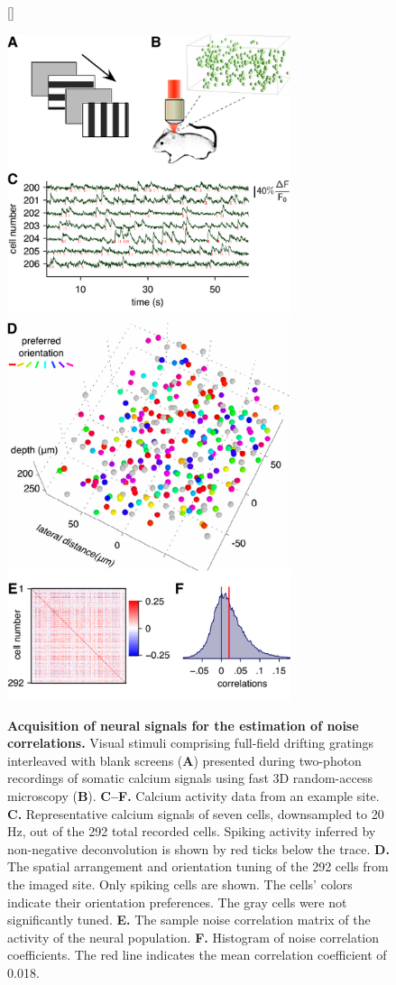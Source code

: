 \documentclass[10pt]{article}
\begin{document}
\begin{figure}    [\FBwidth]
    {\caption{{\bf Acquisition of neural signals for the estimation of noise correlations.}
    Visual stimuli comprising full-field drifting gratings interleaved with blank screens ({\bf A}) presented during two-photon recordings of somatic calcium signals using fast 3D random-access microscopy ({\bf B}). 
    {\bf C--F.} Calcium activity data from an example site.
    {\bf C.} Representative calcium signals of seven cells, downsampled to 20 Hz, out of the 292 total recorded cells. Spiking activity inferred by non-negative deconvolution is shown by red ticks below the trace.
    {\bf D.} The spatial arrangement and orientation tuning of the 292 cells from the imaged site. Only spiking cells are shown. The cells' colors indicate their orientation preferences. The gray cells were not significantly tuned.
    {\bf E.} The sample noise correlation matrix of the activity of the neural population. 
    {\bf F.} Histogram of noise correlation coefficients. The red line indicates the mean correlation coefficient of 0.018.
} \label{fig:2}}
    {\includegraphics[width=8.3cm]{figures/Figure02.pdf}}
\end{figure}
\end{document}
